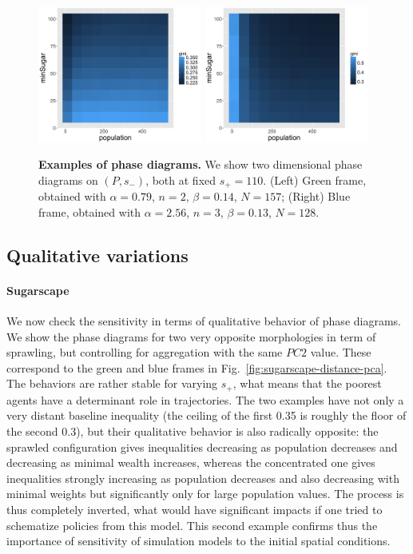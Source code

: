 \documentclass[Royal,sageh,times]{sagej}
\begin{document}
\begin{figure}
\centering
\includegraphics[width=0.48\textwidth]{figures/phasediagram_id27_maxSugar110}
\includegraphics[width=0.48\textwidth]{figures/phasediagram_id0_maxSugar110}
\caption{\textbf{Examples of phase diagrams.} We show two dimensional phase diagrams on $(P,s_-)$, both at fixed $s_+ = 110$. (Left) Green frame, obtained with $\alpha = 0.79$, $n=2$, $\beta = 0.14$, $N=157$; (Right) Blue frame, obtained with $\alpha = 2.56$, $n=3$, $\beta = 0.13$, $N=128$.}
\label{fig:sugarscape-phasediagrams}
\end{figure}


\subsection{Qualitative variations}
\paragraph{Sugarscape} We now check the sensitivity in terms of qualitative behavior of phase diagrams. We show the phase diagrams for two very opposite morphologies in term of sprawling, but controlling for aggregation with the same $PC2$ value. These correspond to the green and blue frames in Fig.~\ref{fig:sugarscape-distance-pca}. The behaviors are rather stable for varying $s_+$, what means that the poorest agents have a determinant role in trajectories. The two examples have not only a very distant baseline inequality (the ceiling of the first 0.35 is roughly the floor of the second 0.3), but their qualitative behavior is also radically opposite: the sprawled configuration gives inequalities decreasing as population decreases and decreasing as minimal wealth increases, whereas the concentrated one gives inequalities strongly increasing as population decreases and also decreasing with minimal weights but significantly only for large population values. The process is thus completely inverted, what would have significant impacts if one tried to schematize policies from this model. This second example confirms thus the importance of sensitivity of simulation models to the initial spatial conditions.
\end{document}
